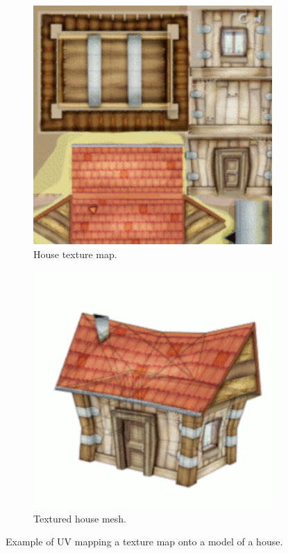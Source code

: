 \begin{figure}[h!]
  \centering
  \begin{subfigure}[b]{0.30\textwidth}
    \includegraphics[width=\textwidth]{figure/uv-mapping1.png}
    \caption{House texture map.}
  \end{subfigure}
  \quad
  \quad
  \quad
  \begin{subfigure}[b]{0.30\textwidth}
    \includegraphics[width=\textwidth]{figure/uv-mapping2.png}
    \caption{Textured house mesh.}
  \end{subfigure}

  \caption{Example of UV mapping a texture map onto a model of a house. \cite{house_uv_mapping}}
  \label{fig:uv-mapping}
\end{figure}

